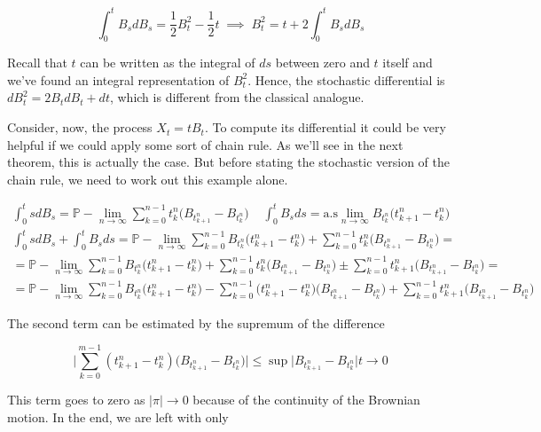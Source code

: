\begin{equation*}
    \int_0^t B_s dB_s = \frac{1}{2}B_t^2 - \frac{1}{2}t \; \implies \; B_t^2 = t+2\int_0^t B_s dB_s
\end{equation*}

Recall that $t$ can be written as the integral of $ds$ between zero and $t$ itself and we've found an integral representation of $B_t^2$. Hence, the stochastic differential is $dB_t^2 = 2B_t dB_t+dt$, which is different from the classical analogue.

Consider, now, the process $X_t = t B_t$. To compute its differential it could be very helpful if we could apply some sort of chain rule. As we'll see in the next theorem, this is actually the case. But before stating the stochastic version of the chain rule, we need to work out this example alone. 

\begin{gather*}
    \int_0^t s dB_s = \mathbb{P}-\lim_{n \to \infty} \sum_{k=0}^{n-1} t_k^n \big( B_{t^n_{k+1}}-B_{t^n_k}\big) \;\;\;\; \int_0^t B_s ds = \text{a.s}\lim_{n \to \infty} B_{t_k^n} \big( t_{k+1}^n-t_{k}^n \big) \\
    \int_0^t s dB_s + \int_0^t B_s ds = \mathbb{P}-\lim_{n \to \infty} \sum_{k=0}^{n-1} B_{t^n_k}\big( t_{k+1}^n-t_k^n \big) + \sum_{k=0}^{n-1} t_k^n \big( B_{t^n_{k+1}}-B_{t^n_k} \big) = \\
    = \mathbb{P}-\lim_{n \to \infty} \sum_{k=0}^{n-1} B_{t^n_k}\big( t_{k+1}^n-t_k^n \big) + \sum_{k=0}^{n-1} t_k^n \big( B_{t^n_{k+1}}-B_{t^n_k} \big) \pm \sum_{k=0}^{n-1} t_{k+1}^n \Big( B_{t_{k+1}^n}-B_{t_k^n} \Big) = \\
    = \mathbb{P}-\lim_{n \to \infty} \sum_{k=0}^{n-1} B_{t^n_k} \big(t_{k+1}^n- t_k^n\big) - \sum_{k=0}^{n-1} \big( t_{k+1}^n-t_k^n \big)\big( B_{t^n_{k+1}} - B_{t^n_k} \big) + \sum_{k=0}^{n-1} t_{k+1}^n \big( B_{t^n_{k+1}}-B_{t^n_k} \big)
\end{gather*}

The second term can be estimated by the supremum of the difference 

\begin{equation*}
    \Big\vert \sum_{k=0}^{m-1} (t_{k+1}^n - t_k^n) \big( B_{t^n_{k+1}} - B_{t^n_k} \big) \Big\vert \leq \sup \big\vert B_{t^n_{k+1}} - B_{t^n_k} \big\vert t \to 0
\end{equation*}

This term goes to zero as $\vert \pi \vert \to 0$ because of the continuity of the Brownian motion. In the end, we are left with only

